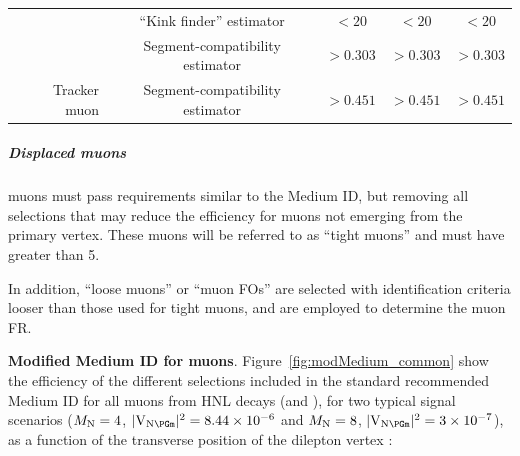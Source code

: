 \begin{table}[h!]
{\begin{tabular}{r|c|c|c|c}
      & ``Kink finder'' estimator & $<20$ & $<20$ & $<20$ \\
      & Segment-compatibility estimator & $>0.303$ & $>0.303$ & $>0.303$ \\
      \hline
      Tracker muon & Segment-compatibility estimator & $>0.451$ & $>0.451$ & $>0.451$ \\
      \hline
    \end{tabular}
    }
\end{table}

\subparagraph {Displaced muons}
\Displ muons must pass requirements similar to the Medium ID, but
removing all selections that may reduce the efficiency for muons not
emerging from the primary vertex.
These \displ muons will be referred to as ``tight \displ muons''
and must have \pt greater than 5\GeV.

In addition, ``loose \displ muons'' or ``muon FOs'' are selected
with identification criteria looser than those used for tight
\displ muons, and are employed to determine the muon FR.

\textbf{Modified Medium ID for \displ muons}.
Figure~\ref{fig:modMedium_common}
show the efficiency of the different selections included in the
standard recommended Medium ID for all \displ muons from HNL
decays (\ltwo and \lthree), for two typical signal scenarios
($M_{\mathrm{N}}=4$\GeV, $\mixparm=8.44\times10^{-6}$ and
$M_{\mathrm{N}}=8$\GeV, $\mixparm=3\times10^{-7}$),
as a function of the transverse position of the dilepton vertex
\Deltwod:

